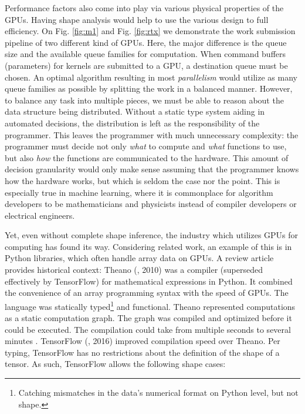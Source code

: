 \documentclass{report}
\begin{document}
Performance factors also come into play via various physical properties of the GPUs. Having shape analysis would help to use the various design to full efficiency. On Fig. \ref{fig:m1} and Fig. \ref{fig:rtx} we demonstrate the work submission pipeline of two different kind of GPUs. Here, the major difference is the queue size and the available queue families for computation. When command buffers (parameters) for kernels are submitted to a GPU, a destination queue must be chosen. An optimal algorithm resulting in most \emph{parallelism} would utilize as many queue families as possible by splitting the work in a balanced manner. However, to balance any task into multiple pieces, we must be able to reason about the data structure being distributed. Without a static type system aiding in automated decisions, the distribution is left as the responsibility of the programmer. This leaves the programmer with much unnecessary complexity: the programmer must decide not only \emph{what} to compute and \emph{what} functions to use, but also \emph{how} the functions are communicated to the hardware. This amount of decision granularity would only make sense assuming that the programmer knows how the hardware works, but which is seldom the case nor the point. This is especially true in machine learning, where it is commonplace for algorithm developers to be mathematicians and physicists instead of compiler developers or electrical engineers.

Yet, even without complete shape inference, the industry which utilizes GPUs for computing has found its way. Considering related work, an example of this is in Python libraries, which often handle array data on GPUs. A review article \cite{raschka2020machine} provides historical context: Theano (\cite{bergstra2010theano}, 2010) was a compiler (superseded effectively by TensorFlow) for mathematical expressions in Python. It combined the convenience of an array programming syntax with the speed of GPUs. The language was statically typed\footnote{Catching mismatches in the data's numerical format on Python level, but not shape.} and functional. Theano represented computations as a static computation graph. The graph was compiled and optimized before it could be executed. The compilation could take from multiple seconds to several minutes \cite{raschka2020machine}. TensorFlow (\cite{abadi2016tensorflow}, 2016) improved compilation speed over Theano. Per typing, TensorFlow has no restrictions about the definition of the shape of a tensor. As such, TensorFlow allows the following shape cases:
\end{document}
